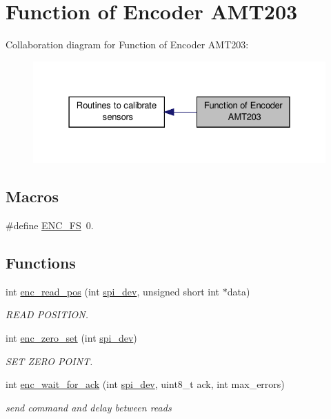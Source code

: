\hypertarget{group__enc}{\section{Function of Encoder A\-M\-T203}
\label{group__enc}
}
Collaboration diagram for Function of Encoder A\-M\-T203\-:
\nopagebreak
\begin{figure}[H]
\begin{center}
\leavevmode
\includegraphics[width=328pt]{group__enc}
\end{center}
\end{figure}
\subsection*{Macros}
\begin{DoxyCompactItemize}
\item 
\#define \hyperlink{group__enc_gadf9edcc7e266ed7333f7570965f5956a}{E\-N\-C\-\_\-\-F\-S}~0.
\end{DoxyCompactItemize}
\subsection*{Functions}
\begin{DoxyCompactItemize}
\item 
int \hyperlink{group__enc_ga813c09cc4d9af8b357fe440a9438e685}{enc\-\_\-read\-\_\-pos} (int \hyperlink{CommunicationV0_2communication_8c_a4788f0a5355494bc6c13690e28f43783}{spi\-\_\-dev}, unsigned short int $\ast$data)
\begin{DoxyCompactList}\small\item\em R\-E\-A\-D P\-O\-S\-I\-T\-I\-O\-N. \end{DoxyCompactList}\item 
int \hyperlink{group__enc_gaebbe7b9d3c2571f7481cefacbe36c498}{enc\-\_\-zero\-\_\-set} (int \hyperlink{CommunicationV0_2communication_8c_a4788f0a5355494bc6c13690e28f43783}{spi\-\_\-dev})
\begin{DoxyCompactList}\small\item\em S\-E\-T Z\-E\-R\-O P\-O\-I\-N\-T. \end{DoxyCompactList}\item 
int \hyperlink{group__enc_gad82fb44f2e735628ec95e003e4a1f93c}{enc\-\_\-wait\-\_\-for\-\_\-ack} (int \hyperlink{CommunicationV0_2communication_8c_a4788f0a5355494bc6c13690e28f43783}{spi\-\_\-dev}, uint8\-\_\-t ack, int max\-\_\-errors)
\begin{DoxyCompactList}\small\item\em send command and delay between reads \end{DoxyCompactList}\end{DoxyCompactItemize}



